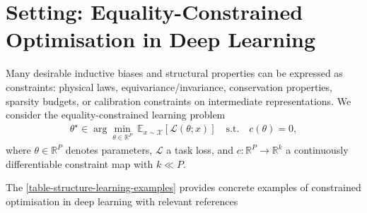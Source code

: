 \section{Setting: Equality-Constrained Optimisation in Deep Learning}
\label{sec:constr_setting}

Many desirable inductive biases and structural properties can be expressed as constraints:
physical laws, equivariance/invariance, conservation properties, sparsity budgets, or calibration constraints on intermediate representations.
We consider the equality-constrained learning problem
\begin{align}
\label{eq:constr_opt_nn_ch8}
    \theta^\star \in \arg\min_{\theta\in\mathbb{R}^P}
    \ \mathbb{E}_{x\sim\mathcal{X}}\!\left[\mathcal{L}(\theta;x)\right]
    \quad \text{s.t.}\quad
    c(\theta)=0,
\end{align}
where $\theta\in\mathbb{R}^P$ denotes parameters, $\mathcal{L}$ a task loss, and $c:\mathbb{R}^P\to\mathbb{R}^k$ a continuously differentiable constraint map with $k\ll P$.


The \cref{table-structure-learning-examples} provides concrete examples of constrained optimisation in deep learning with relevant references 

